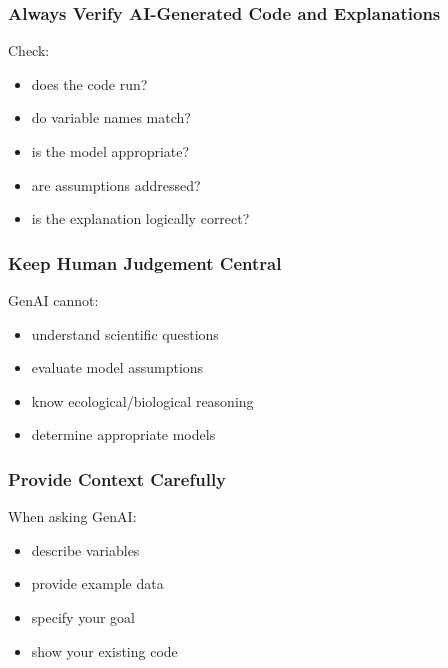 \documentclass[
  letterpaper,
  8pt,
  a4paper]{book}
\providecommand{\tightlist}{%
  \setlength{\itemsep}{0pt}\setlength{\parskip}{0pt}}
\begin{document}
\subsubsection*{Always Verify AI-Generated Code and
Explanations}\label{always-verify-ai-generated-code-and-explanations}

Check:

\begin{itemize}
\tightlist
\item
  does the code run?\\
\item
  do variable names match?\\
\item
  is the model appropriate?\\
\item
  are assumptions addressed?\\
\item
  is the explanation logically correct?
\end{itemize}

\subsubsection*{Keep Human Judgement
Central}\label{keep-human-judgement-central}

GenAI cannot:

\begin{itemize}
\tightlist
\item
  understand scientific questions\\
\item
  evaluate model assumptions\\
\item
  know ecological/biological reasoning\\
\item
  determine appropriate models
\end{itemize}

\subsubsection*{Provide Context
Carefully}\label{provide-context-carefully}

When asking GenAI:

\begin{itemize}
\tightlist
\item
  describe variables\\
\item
  provide example data\\
\item
  specify your goal\\
\item
  show your existing code
\end{itemize}
\end{document}
